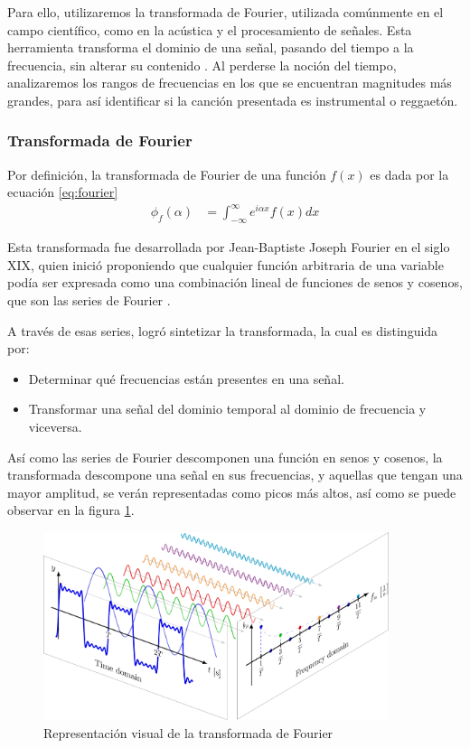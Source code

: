 \documentclass[12pt, letterpaper]{article}
\begin{document}
\noindent Para ello, utilizaremos la transformada de Fourier, utilizada
comúnmente en el campo científico, como en la acústica y el procesamiento de señales.
Esta herramienta transforma el dominio de una señal, pasando del tiempo a la frecuencia,
sin alterar su contenido \cite{Bernal-1999}.
Al perderse la noción del tiempo, analizaremos los rangos de frecuencias en los
que se encuentran magnitudes más grandes, para así identificar si la canción presentada
es instrumental o reggaetón.

\subsubsection{Transformada de Fourier}

Por definición, la transformada de Fourier de una función $f(x)$ es dada por la ecuación \ref{eq:fourier}
\begin{align}
	\phi_f(\alpha) &= \int_{-\infty}^{\infty} e^{i\alpha x} f(x) dx
	\label{eq:fourier}
\end{align}

\noindent Esta transformada fue desarrollada por Jean-Baptiste Joseph Fourier en el siglo XIX,
quien inició proponiendo que cualquier función arbitraria de una variable
podía ser expresada como una combinación lineal de funciones de senos y cosenos,
que son las series de Fourier \cite{OGorman-2023}. \medskip

\noindent A través de esas series, logró sintetizar la transformada, la cual
es distinguida por:
\begin{itemize}
  \item Determinar qué frecuencias están presentes en una señal.
  \item Transformar una señal del dominio temporal al dominio de frecuencia y viceversa.
\end{itemize}

\noindent Así como las series de Fourier descomponen una función en senos y cosenos, la
transformada descompone una señal en sus frecuencias, y aquellas que tengan una mayor
amplitud, se verán representadas como picos más altos, así como se puede observar en
la figura \ref{fig:fourier}.

\begin{figure}[H]
  \centering
  \includegraphics[width=0.9\textwidth]{imgs/investigacion/FourierSeries_Freq.png}
  \caption{Representación visual de la transformada de Fourier \cite{OGorman-2023}}
  \label{fig:fourier}
\end{figure}
\end{document}
